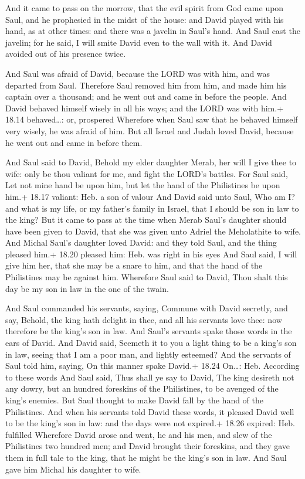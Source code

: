  And it came to pass on the morrow, that the evil spirit
from God came upon Saul, and he prophesied in the midst of the house:
and David played with his hand, as at other times: and there was a
javelin in Saul's hand.  And Saul cast the javelin; for he
said, I will smite David even to the wall with it. And David avoided out
of his presence twice.

 And Saul was afraid of David, because the LORD was with
him, and was departed from Saul.  Therefore Saul removed
him from him, and made him his captain over a thousand; and he went out
and came in before the people.  And David behaved himself
wisely in all his ways; and the LORD was with him.+ 18.14 behaved\ldots:
or, prospered  Wherefore when Saul saw that he behaved
himself very wisely, he was afraid of him.  But all Israel
and Judah loved David, because he went out and came in before them.

 And Saul said to David, Behold my elder daughter Merab,
her will I give thee to wife: only be thou valiant for me, and fight the
LORD's battles. For Saul said, Let not mine hand be upon him, but let
the hand of the Philistines be upon him.+ 18.17 valiant: Heb. a son of
valour  And David said unto Saul, Who am I? and what is my
life, or my father's family in Israel, that I should be son in law to
the king?  But it came to pass at the time when Merab
Saul's daughter should have been given to David, that she was given unto
Adriel the Meholathite to wife.  And Michal Saul's daughter
loved David: and they told Saul, and the thing pleased him.+ 18.20
pleased him: Heb. was right in his eyes  And Saul said, I
will give him her, that she may be a snare to him, and that the hand of
the Philistines may be against him. Wherefore Saul said to David, Thou
shalt this day be my son in law in the one of the twain.

 And Saul commanded his servants, saying, Commune with
David secretly, and say, Behold, the king hath delight in thee, and all
his servants love thee: now therefore be the king's son in law.
 And Saul's servants spake those words in the ears of
David. And David said, Seemeth it to you a light thing to be a king's
son in law, seeing that I am a poor man, and lightly esteemed?
 And the servants of Saul told him, saying, On this manner
spake David.+ 18.24 On\ldots: Heb. According to these words
 And Saul said, Thus shall ye say to David, The king
desireth not any dowry, but an hundred foreskins of the Philistines, to
be avenged of the king's enemies. But Saul thought to make David fall by
the hand of the Philistines.  And when his servants told
David these words, it pleased David well to be the king's son in law:
and the days were not expired.+ 18.26 expired: Heb. fulfilled
 Wherefore David arose and went, he and his men, and slew
of the Philistines two hundred men; and David brought their foreskins,
and they gave them in full tale to the king, that he might be the king's
son in law. And Saul gave him Michal his daughter to wife.

